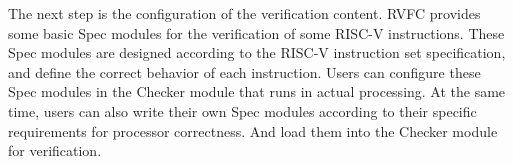 \documentclass[conference]{IEEEtran}
\theoremstyle{definition}
\begin{document}
The next step is the configuration of the verification content.
RVFC provides some basic Spec modules for the verification of some RISC-V instructions.
These Spec modules are designed according to the RISC-V instruction set specification, and define the correct behavior of each instruction.
Users can configure these Spec modules in the Checker module that runs in actual processing.
At the same time, users can also write their own Spec modules according to their specific requirements for processor correctness.
And load them into the Checker module for verification.
\end{document}
